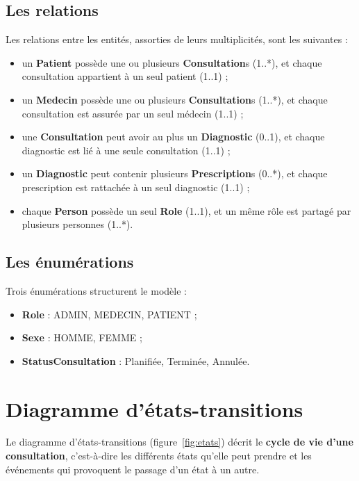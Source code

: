 \subsection{Les relations}

Les relations entre les entités, assorties de leurs multiplicités, sont les suivantes :

\begin{itemize}
    \item un \textbf{Patient} possède une ou plusieurs \textbf{Consultation}s (1..*), et chaque consultation appartient à un seul patient (1..1) ;
    \item un \textbf{Medecin} possède une ou plusieurs \textbf{Consultation}s (1..*), et chaque consultation est assurée par un seul médecin (1..1) ;
    \item une \textbf{Consultation} peut avoir au plus un \textbf{Diagnostic} (0..1), et chaque diagnostic est lié à une seule consultation (1..1) ;
    \item un \textbf{Diagnostic} peut contenir plusieurs \textbf{Prescription}s (0..*), et chaque prescription est rattachée à un seul diagnostic (1..1) ;
    \item chaque \textbf{Person} possède un seul \textbf{Role} (1..1), et un même rôle est partagé par plusieurs personnes (1..*).
\end{itemize}

\subsection{Les énumérations}

Trois énumérations structurent le modèle :

\begin{itemize}
    \item \textbf{Role} : ADMIN, MEDECIN, PATIENT ;
    \item \textbf{Sexe} : HOMME, FEMME ;
    \item \textbf{StatusConsultation} : Planifiée, Terminée, Annulée.
\end{itemize}

\section{Diagramme d'états-transitions}

Le diagramme d'états-transitions (figure~\ref{fig:etats}) décrit le \textbf{cycle de vie d'une consultation}, c'est-à-dire les différents états qu'elle peut prendre et les événements qui provoquent le passage d'un état à un autre.

